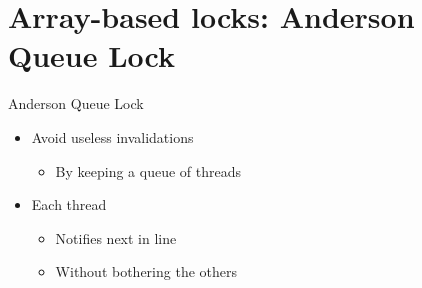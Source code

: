 \section{Array-based locks: Anderson Queue Lock}
\showTOC


\begin{frame}{Anderson Queue Lock}

\begin{itemize}
  \item Avoid useless invalidations
  \begin{itemize}
    \item By keeping a queue of threads  
  \end{itemize}
  \item Each thread
  \begin{itemize}
    \item Notifies next in line
    \item Without bothering the others
  \end{itemize}
\end{itemize}
\end{frame}

